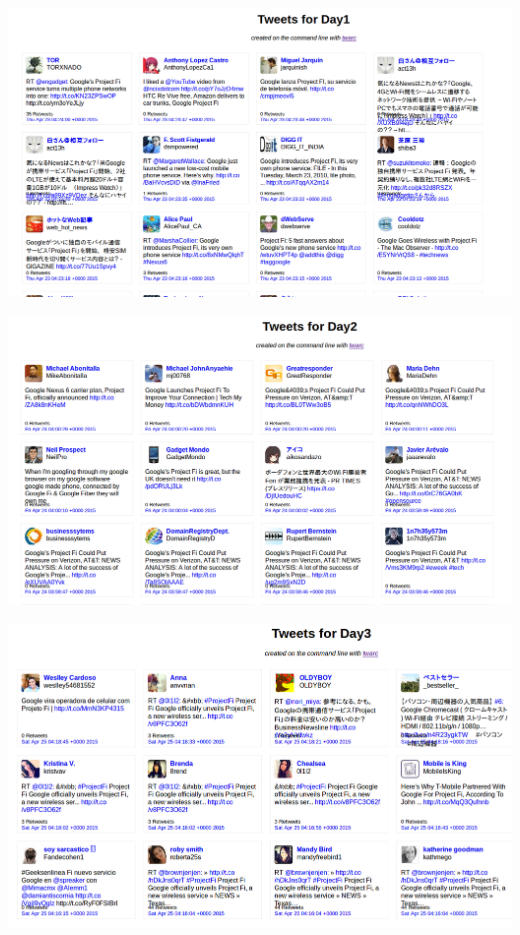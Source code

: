 	\begin{minipage}{\linewidth}
		\centering
			\includegraphics[scale=0.35]{figures/q4/wallDay1}
		\label{wordCount}
	\end{minipage}
	
	\begin{minipage}{\linewidth}
		\centering
			\includegraphics[scale=0.35]{figures/q4/wallDay2}
		\label{wordCount}
	\end{minipage}
	
	\begin{minipage}{\linewidth}
		\centering
			\includegraphics[scale=0.35]{figures/q4/wallDay3}
		\label{wordCount}
	\end{minipage}
	
